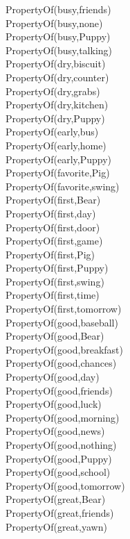\begin{multicols}{2}
\begin{footnotesize}
PropertyOf(busy,friends) \\
PropertyOf(busy,none) \\
PropertyOf(busy,Puppy) \\
PropertyOf(busy,talking) \\
PropertyOf(dry,biscuit) \\
PropertyOf(dry,counter) \\
PropertyOf(dry,grabs) \\
PropertyOf(dry,kitchen) \\
PropertyOf(dry,Puppy) \\
PropertyOf(early,bus) \\
PropertyOf(early,home) \\
PropertyOf(early,Puppy) \\
PropertyOf(favorite,Pig) \\
PropertyOf(favorite,swing) \\
PropertyOf(first,Bear) \\
PropertyOf(first,day) \\
PropertyOf(first,door) \\
PropertyOf(first,game) \\
PropertyOf(first,Pig) \\
PropertyOf(first,Puppy) \\
PropertyOf(first,swing) \\
PropertyOf(first,time) \\
PropertyOf(first,tomorrow) \\
PropertyOf(good,baseball) \\
PropertyOf(good,Bear) \\
PropertyOf(good,breakfast) \\
PropertyOf(good,chances) \\
PropertyOf(good,day) \\
PropertyOf(good,friends) \\
PropertyOf(good,luck) \\
PropertyOf(good,morning) \\
PropertyOf(good,news) \\
PropertyOf(good,nothing) \\
PropertyOf(good,Puppy) \\
PropertyOf(good,school) \\
PropertyOf(good,tomorrow) \\
PropertyOf(great,Bear) \\
PropertyOf(great,friends) \\
PropertyOf(great,yawn) \\

\end{footnotesize}
\end{multicols}
